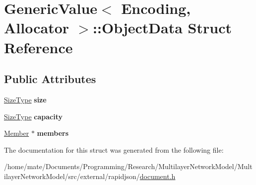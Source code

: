 \hypertarget{structGenericValue_1_1ObjectData}{}\section{Generic\+Value$<$ Encoding, Allocator $>$\+:\+:Object\+Data Struct Reference}
\label{structGenericValue_1_1ObjectData}
\subsection*{Public Attributes}
\begin{DoxyCompactItemize}
\item 
\hyperlink{rapidjson_8h_a5ed6e6e67250fadbd041127e6386dcb5}{Size\+Type} {\bfseries size}\hypertarget{structGenericValue_1_1ObjectData_a8aa09c430b245b9bb0745a1ab38201d5}{}\label{structGenericValue_1_1ObjectData_a8aa09c430b245b9bb0745a1ab38201d5}

\item 
\hyperlink{rapidjson_8h_a5ed6e6e67250fadbd041127e6386dcb5}{Size\+Type} {\bfseries capacity}\hypertarget{structGenericValue_1_1ObjectData_a22b8d8b01d52db71471f0d4c990cb93b}{}\label{structGenericValue_1_1ObjectData_a22b8d8b01d52db71471f0d4c990cb93b}

\item 
\hyperlink{classGenericValue_a7ccf27c44058b4c11c3efc6473afb886}{Member} $\ast$ {\bfseries members}\hypertarget{structGenericValue_1_1ObjectData_a108be865f16e4c028f2354b1474a1ec8}{}\label{structGenericValue_1_1ObjectData_a108be865f16e4c028f2354b1474a1ec8}

\end{DoxyCompactItemize}


The documentation for this struct was generated from the following file\+:\begin{DoxyCompactItemize}
\item 
/home/mate/\+Documents/\+Programming/\+Research/\+Multilayer\+Network\+Model/\+Multilayer\+Network\+Model/src/external/rapidjson/\hyperlink{document_8h}{document.\+h}\end{DoxyCompactItemize}
